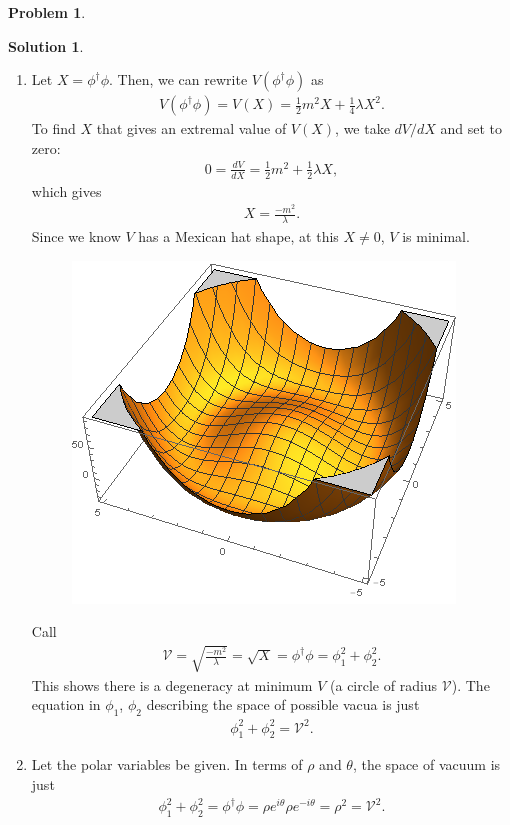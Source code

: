 \documentclass[a4paper,11pt]{article}
\numberwithin{equation}{section}
\theoremstyle{definition}
\newtheorem{prob}{Problem}[section]
\newtheorem{sln}{Solution}[section]
\newcommand{\V}{\mathcal{V}}
\begin{document}
\begin{prob}
\begin{sln}
\begin{enumerate}
			
			
			
			\item  Let $X = \phi^\dagger\phi$. Then, we can rewrite $V(\phi^\dagger\phi)$ as
			\begin{align}
			V(\phi^\dagger\phi) = V(X) = \frac{1}{2}m^2X + \frac{1}{4}\lambda X^2.
			\end{align}
			To find $X$ that gives an extremal value of $V(X)$, we take $dV/dX$ and set to zero:
			\begin{align}
			0 = \frac{dV}{dX} = \frac{1}{2}m^2 + \frac{1}{2}\lambda X,
			\end{align}
			which gives
			\begin{align}
			X = \frac{-m^2}{\lambda}.
			\end{align}
			Since we know $V$ has a Mexican hat shape, at this $X\neq 0$, $V$ is minimal. 
			\begin{figure}[h!]
				\centering
				\includegraphics[scale=1]{hat.png}
			\end{figure}
			
			
			Call
			\begin{align}
			\V = \sqrt{\frac{-m^2}{\lambda}} = \sqrt{X} = \phi^\dagger\phi = {\phi_1^2 + \phi_2^2}.
			\end{align}
			This shows there is a degeneracy at minimum $V$ (a circle of radius $\V$). The equation in $\phi_1$, $\phi_2$ describing the space of possible vacua is just
			\begin{align}
			\phi_1^2 + \phi_2^2 = \V^2.
			\end{align}
			
			
			
			
			\item Let the polar variables be given. In terms of $\rho$ and $\theta$, the space of vacuum is just
			\begin{align}
			\phi_1^2 + \phi_2^2 = \phi^\dagger\phi = \rho e^{i\theta}\rho e^{-i\theta} = \rho^2 = \V^2.
			\end{align}
			

\end{enumerate}
\end{sln}
\end{prob}
\end{document}
